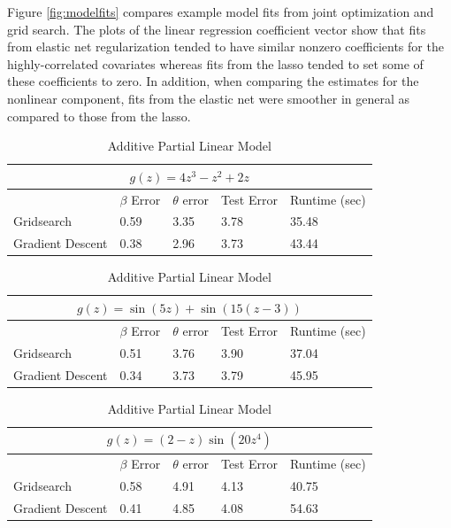 \documentclass[10pt,letterpaper]{article}
\begin{document}
Figure \ref{fig:modelfits} compares example model fits from joint optimization and grid search. The plots of the linear regression coefficient vector show that fits from elastic net regularization tended to have similar nonzero coefficients for the highly-correlated covariates whereas fits from the lasso tended to set some of these coefficients to zero. In addition, when comparing the estimates for the nonlinear component, fits from the elastic net were smoother in general as compared to those from the lasso.


\begin{table}
\begin{center}
\begin{tabular}{| l | l | l | l | l | }
\hline
\multicolumn{5}{|c|}{$g(z) = 4z^3 - z^2 + 2z$}\\
\hline
 & $\beta$ Error & $\theta$ error & Test Error & Runtime (sec) \\
\hline
Gridsearch & 0.59 & 3.35 & 3.78 & 35.48 \\
\hline
Gradient Descent & 0.38 & 2.96 & 3.73 & 43.44 \\
\hline
\end{tabular}

\begin{tabular}{| l | l | l | l | l | }
\hline
\multicolumn{5}{|c|}{$g(z) = \sin(5z) + \sin(15(z - 3))$}\\
\hline
 & $\beta$ Error & $\theta$ error & Test Error & Runtime (sec) \\
\hline
Gridsearch & 0.51 & 3.76 & 3.90 & 37.04 \\
\hline
Gradient Descent & 0.34 & 3.73 & 3.79 & 45.95 \\
\hline
\end{tabular}

\begin{tabular}{| l | l | l | l | l | }
\hline
\multicolumn{5}{|c|}{$g(z) = (2-z)\sin(20z^4)$}\\
\hline
 & $\beta$ Error & $\theta$ error & Test Error & Runtime (sec) \\
\hline
Gridsearch & 0.58 & 4.91 & 4.13 & 40.75 \\
\hline
Gradient Descent & 0.41 & 4.85 & 4.08 & 54.63 \\
\hline
\end{tabular}
\end{center}
\caption {Additive Partial Linear Model}
\label{ref:aplm}
\end{table}
\end{document}
